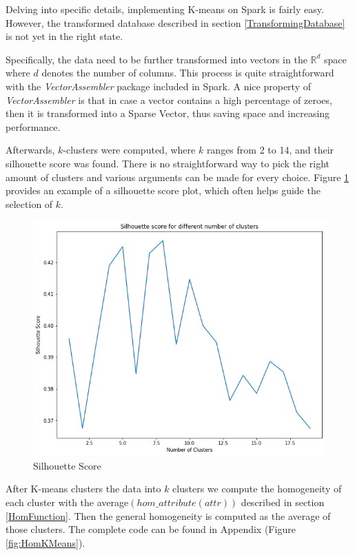 \documentclass[sigconf]{acmart}
\begin{document}
Delving into specific details, implementing K-means on Spark is fairly easy. However, the transformed database described in section \ref{TransformingDatabase} is not yet in the right state.

Specifically, the data need to be further transformed into vectors in the $\mathbb{R}^d$ space where $d$ denotes the number of columns. This process is quite straightforward with the \textit{VectorAssembler} package included in Spark. A nice property of \textit{VectorAssembler} is that in case a vector contains a high percentage of zeroes, then it is transformed into a Sparse Vector, thus saving space and increasing performance.

Afterwards, $k$-clusters were computed, where $k$ ranges from 2 to 14, and their silhouette score was found. There is no straightforward way to pick the right amount of clusters and various arguments can be made for every choice. Figure \ref{fig:SilhScore} provides an example of a silhouette score plot, which often helps guide the selection of $k$. 
\begin{figure}[h!]
    \centering
    \includegraphics[scale=0.35]{images/SilhouetteScore.png}
    \caption{Silhouette Score}
    \label{fig:SilhScore}
\end{figure}

After K-means clusters the data into $k$ clusters we compute the homogeneity of each cluster with the average$(hom\_attribute(attr))$ described in section \ref{HomFunction}. Then the general homogeneity is computed as the average of those clusters. The complete code can be found in Appendix (Figure \ref{fig:HomKMeans}).
\end{document}
